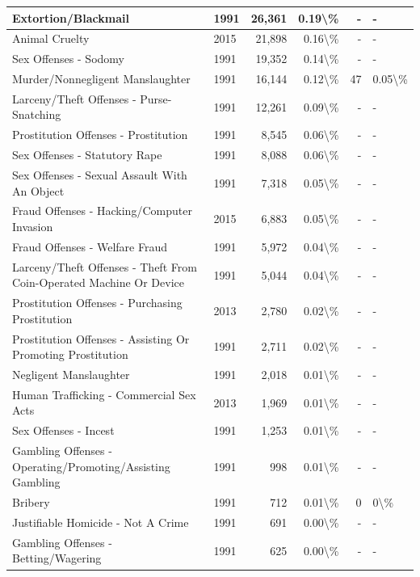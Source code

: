 \documentclass[
]{krantz}
\begin{document}
\begin{longtable}[t]{l|l|r|r|r|l}
\hline
Extortion/Blackmail & 1991 & 26,361 & 0.19\textbackslash{}\% & - & -\\
\hline
Animal Cruelty & 2015 & 21,898 & 0.16\textbackslash{}\% & - & -\\
\hline
Sex Offenses - Sodomy & 1991 & 19,352 & 0.14\textbackslash{}\% & - & -\\
\hline
Murder/Nonnegligent Manslaughter & 1991 & 16,144 & 0.12\textbackslash{}\% & 47 & 0.05\textbackslash{}\%\\
\hline
Larceny/Theft Offenses - Purse-Snatching & 1991 & 12,261 & 0.09\textbackslash{}\% & - & -\\
\hline
Prostitution Offenses - Prostitution & 1991 & 8,545 & 0.06\textbackslash{}\% & - & -\\
\hline
Sex Offenses - Statutory Rape & 1991 & 8,088 & 0.06\textbackslash{}\% & - & -\\
\hline
Sex Offenses - Sexual Assault With An Object & 1991 & 7,318 & 0.05\textbackslash{}\% & - & -\\
\hline
Fraud Offenses - Hacking/Computer Invasion & 2015 & 6,883 & 0.05\textbackslash{}\% & - & -\\
\hline
Fraud Offenses - Welfare Fraud & 1991 & 5,972 & 0.04\textbackslash{}\% & - & -\\
\hline
Larceny/Theft Offenses - Theft From Coin-Operated Machine Or Device & 1991 & 5,044 & 0.04\textbackslash{}\% & - & -\\
\hline
Prostitution Offenses - Purchasing Prostitution & 2013 & 2,780 & 0.02\textbackslash{}\% & - & -\\
\hline
Prostitution Offenses - Assisting Or Promoting Prostitution & 1991 & 2,711 & 0.02\textbackslash{}\% & - & -\\
\hline
Negligent Manslaughter & 1991 & 2,018 & 0.01\textbackslash{}\% & - & -\\
\hline
Human Trafficking - Commercial Sex Acts & 2013 & 1,969 & 0.01\textbackslash{}\% & - & -\\
\hline
Sex Offenses - Incest & 1991 & 1,253 & 0.01\textbackslash{}\% & - & -\\
\hline
Gambling Offenses - Operating/Promoting/Assisting Gambling & 1991 & 998 & 0.01\textbackslash{}\% & - & -\\
\hline
Bribery & 1991 & 712 & 0.01\textbackslash{}\% & 0 & 0\textbackslash{}\%\\
\hline
Justifiable Homicide - Not A Crime & 1991 & 691 & 0.00\textbackslash{}\% & - & -\\
\hline
Gambling Offenses - Betting/Wagering & 1991 & 625 & 0.00\textbackslash{}\% & - & -\\

\end{longtable}
\end{document}
